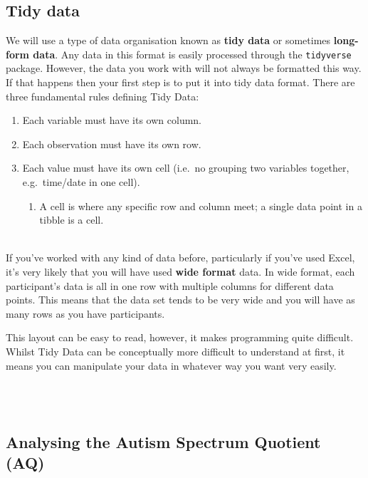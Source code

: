 \documentclass[]{book}
\providecommand{\tightlist}{%
  \setlength{\itemsep}{0pt}\setlength{\parskip}{0pt}}
\newenvironment{try}
    {
    \hline\\
    }
    { 
    \\\\\hline
    }
\begin{document}
\hypertarget{tidy-data}{%
\subsection{Tidy data}\label{tidy-data}}

We will use a type of data organisation known as \textbf{tidy data} or sometimes \textbf{long-form data}. Any data in this format is easily processed through the \texttt{tidyverse} package. However, the data you work with will not always be formatted this way. If that happens then your first step is to put it into tidy data format. There are three fundamental rules defining Tidy Data:

\begin{enumerate}
\def\labelenumi{\arabic{enumi}.}
\tightlist
\item
  Each variable must have its own column.
\item
  Each observation must have its own row.
\item
  Each value must have its own cell (i.e.~no grouping two variables together, e.g.~time/date in one cell).

  \begin{enumerate}
  \def\labelenumii{\roman{enumii})}
  \tightlist
  \item
    A cell is where any specific row and column meet; a single data point in a tibble is a cell.
  \end{enumerate}
\end{enumerate}

\begin{try}
If you've worked with any kind of data before, particularly if you've
used Excel, it's very likely that you will have used \textbf{wide
format} data. In wide format, each participant's data is all in one row
with multiple columns for different data points. This means that the
data set tends to be very wide and you will have as many rows as you
have participants.

This layout can be easy to read, however, it makes programming quite
difficult. Whilst Tidy Data can be conceptually more difficult to
understand at first, it means you can manipulate your data in whatever
way you want very easily.
\end{try}

\hypertarget{analysing-the-autism-spectrum-quotient-aq}{%
\subsection{Analysing the Autism Spectrum Quotient (AQ)}\label{analysing-the-autism-spectrum-quotient-aq}}
\end{document}
